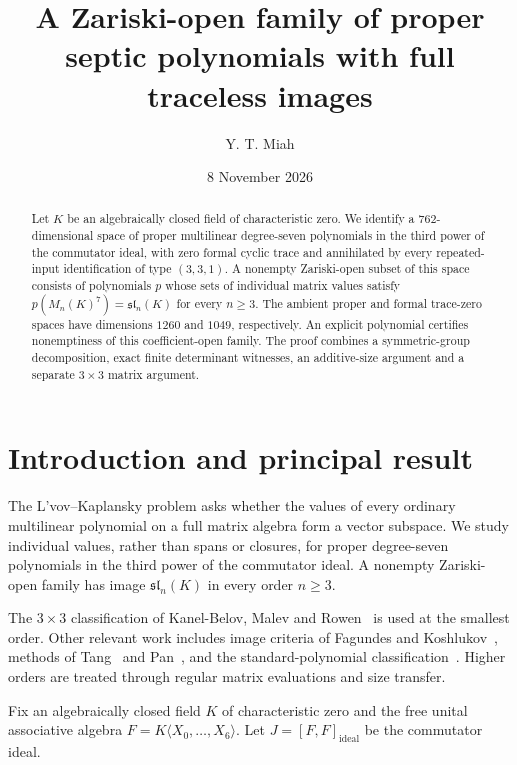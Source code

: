 \documentclass[11pt,reqno]{amsart}
\theoremstyle{definition}
\begin{document}
\title[Traceless images of proper septics]{A Zariski-open family of proper septic polynomials with full traceless images}
\author{Y. T. Miah}
\date{8 November 2026}

\begin{abstract}
Let $K$ be an algebraically closed field of characteristic zero.  We identify a $762$-dimensional space of proper multilinear degree-seven polynomials in the third power of the commutator ideal, with zero formal cyclic trace and annihilated by every repeated-input identification of type $(3,3,1)$.  A nonempty Zariski-open subset of this space consists of polynomials $p$ whose sets of individual matrix values satisfy $p(M_n(K)^7)=\mathfrak{sl}_n(K)$ for every $n\geq3$.  The ambient proper and formal trace-zero spaces have dimensions $1260$ and $1049$, respectively.  An explicit polynomial certifies nonemptiness of this coefficient-open family.  The proof combines a symmetric-group decomposition, exact finite determinant witnesses, an additive-size argument and a separate $3\times3$ matrix argument.
\end{abstract}
\maketitle

\section{Introduction and principal result}
The L'vov--Kaplansky problem asks whether the values of every ordinary multilinear polynomial on a full matrix algebra form a vector subspace.  We study individual values, rather than spans or closures, for proper degree-seven polynomials in the third power of the commutator ideal.  A nonempty Zariski-open family has image $\mathfrak{sl}_n(K)$ in every order $n\ge3$.

The $3\times3$ classification of Kanel-Belov, Malev and Rowen~\cite{KBR2016} is used at the smallest order.  Other relevant work includes image criteria of Fagundes and Koshlukov~\cite{FagundesKoshlukov2023}, methods of Tang~\cite{Tang2026} and Pan~\cite{Pan2026}, and the standard-polynomial classification~\cite{Miah2026}.  Higher orders are treated through regular matrix evaluations and size transfer.

Fix an algebraically closed field $K$ of characteristic zero and the free unital associative algebra $F=K\langle X_0,\ldots,X_6\rangle$.  Let $J=[F,F]_{\mathrm{ideal}}$ be the commutator ideal.
\end{document}
